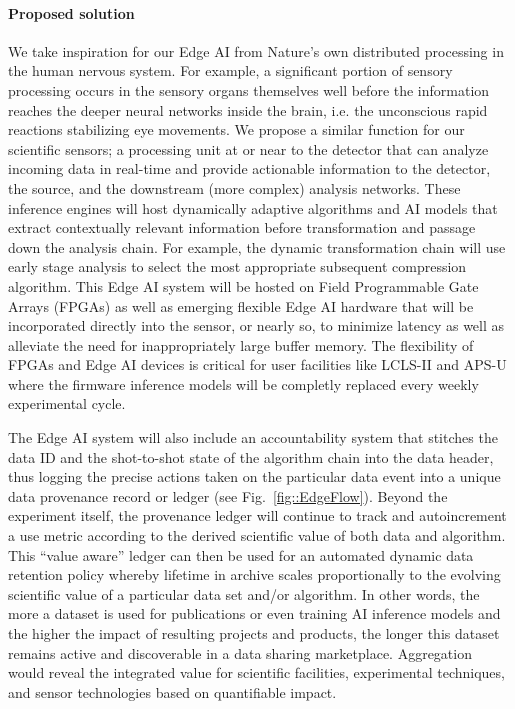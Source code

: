 \documentclass{article}
\begin{document}
\paragraph{Proposed solution}%
We take inspiration for our Edge AI from Nature's own distributed processing in the human nervous system.
For example, a significant portion of sensory processing occurs in the sensory organs themselves well before the information reaches the deeper neural networks inside the brain, i.e. the unconscious rapid reactions stabilizing eye movements.
We propose a similar function for our scientific sensors; a processing unit at or near to the detector that can analyze incoming data in real-time and provide actionable information to the detector, the source, and the downstream (more complex) analysis networks.
These inference engines will host dynamically adaptive algorithms and AI models that extract contextually relevant information before transformation and passage down the analysis chain.
For example, the dynamic transformation chain will use early stage analysis to select the most appropriate subsequent compression algorithm.
This Edge AI system will be hosted on Field Programmable Gate Arrays (FPGAs) as well as emerging flexible Edge AI hardware \cite{edgetpu_benchmarks,edgetpu,waveCGRA,CGRAreview,seaofcores} that will be incorporated directly into the sensor, or nearly so, to minimize latency as well as alleviate the need for inappropriately large buffer memory.
The flexibility of FPGAs and Edge AI devices is critical for user facilities like LCLS-II and APS-U where the firmware inference models will be completly replaced every weekly experimental cycle.

The Edge AI system will also include an accountability system that stitches the data ID and the shot-to-shot state of the algorithm chain into the data header, thus logging the precise actions taken on the particular data event into a unique data provenance record or ledger (see Fig.~\ref{fig::EdgeFlow}).
Beyond the experiment itself, the provenance ledger will continue to track and autoincrement a use metric according to the derived scientific value of both data and algorithm.
This ``value aware'' ledger can then be used for an automated dynamic data retention policy whereby lifetime in archive scales proportionally to the evolving scientific value of a particular data set and/or algorithm.
In other words, the more a dataset is used for publications or even training AI inference models and the higher the impact of resulting projects and products, the longer this dataset remains active and discoverable in a data sharing marketplace. %
Aggregation would reveal the integrated value for scientific facilities, experimental techniques, and sensor technologies based on quantifiable impact.
\end{document}
